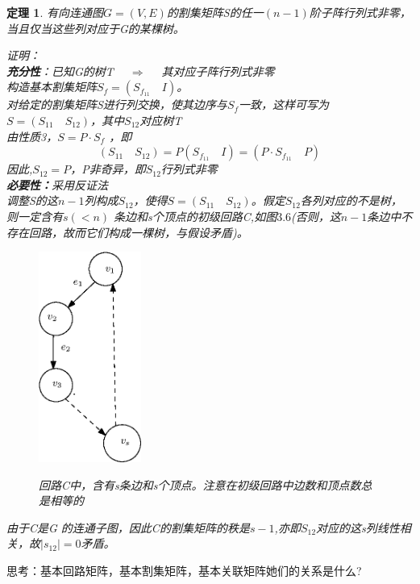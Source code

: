 \documentclass[11pt,a4paper,openany]{book}
\newcommand{\hwxw}{\CJKfamily{hwxw}}
\newcommand{\song}{\CJKfamily{song}}
\newtheorem{theorem}{\textbf{定理}}[section]
\begin{document}
\begin{theorem}
有向连通图$G=(V,E)$的割集矩阵S的任一$(n-1)$阶子阵行列式非零，当且仅当这些列对应于G的某棵树。\\
{\song
证明：\\
\textbf{充分性}：已知G的树T $\quad \Rightarrow \quad$ 其对应子阵行列式非零\\
构造基本割集矩阵$S_f=(S_{f_{11}} \quad I)$。\\
对给定的割集矩阵S进行列交换，使其边序与$S_f$一致，这样可写为$S=(S_{11} \quad S_{12})$，其中$S_{12}$对应树T\\
由性质3，$S=P\cdot S_f$ ，即$$(S_{11} \quad S_{12})=P(S_{f_{11}} \quad I)=(P\cdot S_{f_{11}} \quad P)$$
因此,$S_{12}=P$，P非奇异，即$S_{12}$行列式非零\\
\textbf{必要性：}采用反证法\\
调整S的这$n-1$列构成$S_{12}$，使得$S=(S_{11}\quad S_{12})$。假定$S_{12}$各列对应的不是树，则一定含有$s(<n)$
条边和s个顶点的初级回路C,如图$3.6$(否则，这$n-1$条边中不存在回路，故而它们构成一棵树，与假设矛盾)。
\begin{figure}[H]
  \centering
  \includegraphics[width=0.3\textwidth]{3_61.eps}\\
  \caption{回路C中，含有s条边和s个顶点。注意在初级回路中边数和顶点数总是相等的}
\end{figure}
由于C是G 的连通子图，因此C的割集矩阵的秩是$s-1$,亦即$S_{12}$对应的这s列线性相关，故$|s_{12}|=0$矛盾。
}
\end{theorem}
{\hwxw 思考：基本回路矩阵，基本割集矩阵，基本关联矩阵她们的关系是什么?}\\
\end{document}
